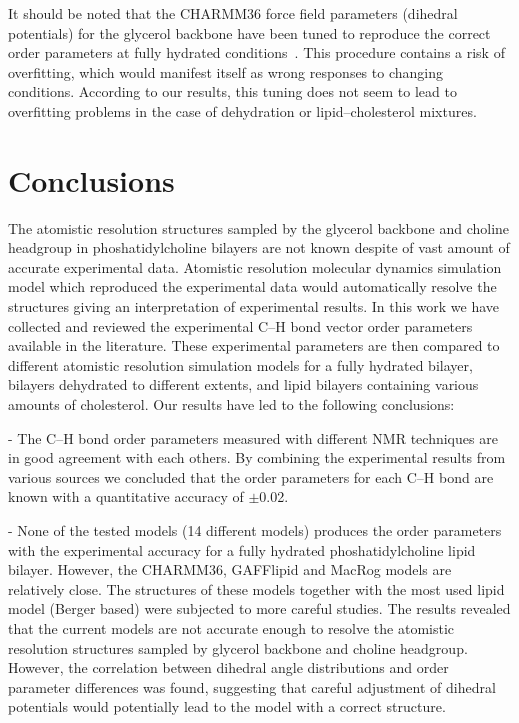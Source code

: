 \documentclass[pre,aps,floatfix,authordate1-4,twocolumn]{revtex4-1}
\begin{document}
It should be noted that the CHARMM36 force field parameters (dihedral potentials) for the glycerol backbone have been tuned to reproduce the correct order parameters at fully hydrated conditions~\cite{klauda10}. 
This procedure contains a risk of overfitting, which would manifest itself as wrong responses to changing conditions. 
According to our results, this tuning does not seem to lead to overfitting problems in the case of dehydration or lipid--cholesterol mixtures. 



\section{Conclusions}
The atomistic resolution structures sampled by the glycerol backbone and choline headgroup
in phoshatidylcholine bilayers are not known despite of vast amount of accurate experimental
data. Atomistic resolution molecular dynamics simulation model which reproduced the
experimental data would automatically resolve the structures giving an interpretation of experimental results.
In this work we have collected and reviewed the experimental C--H bond vector order
parameters available in the literature. These experimental parameters are then compared to
different atomistic resolution simulation models for a fully hydrated bilayer, bilayers dehydrated to different extents, and
lipid bilayers containing various amounts of cholesterol. Our results have led to the following conclusions:

- The C--H bond order parameters measured with different NMR techniques are in good agreement
with each others. By combining the experimental results from various sources we concluded
that the order parameters for each C--H bond are known with a quantitative accuracy of $\pm$0.02.

- None of the tested models (14 different models) produces the order parameters with the experimental
accuracy for a fully hydrated phoshatidylcholine lipid bilayer. However, the CHARMM36, GAFFlipid and MacRog 
models are relatively close. The structures of these models together with the most used lipid model (Berger based) 
were subjected to more careful studies. The results revealed that the current models are not accurate
enough to resolve the atomistic resolution structures sampled by glycerol backbone and choline headgroup.  
However, the correlation between dihedral angle distributions and order parameter differences was found, 
suggesting that careful adjustment of dihedral potentials would potentially lead to the model with a correct
structure.
\end{document}
